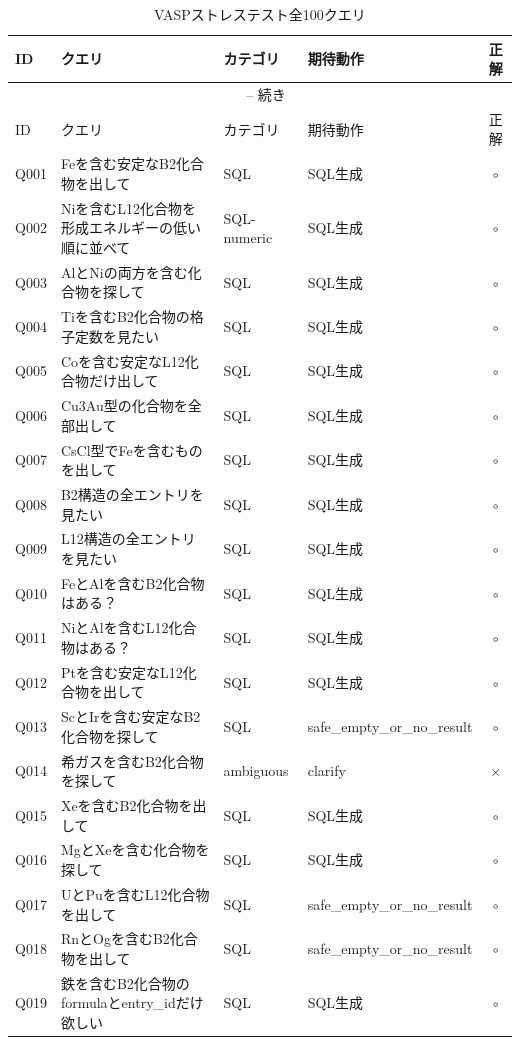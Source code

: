 \documentclass[3p]{elsarticle}
\begin{document}
\begin{longtable}{lp{5cm}llc}
\caption{VASPストレステスト全100クエリ}
\label{tab:vasp_full} \\
\toprule
ID & クエリ & カテゴリ & 期待動作 & 正解 \\
\midrule
\endfirsthead
\multicolumn{5}{c}{\tablename~\thetable{} -- 続き} \\
\toprule
ID & クエリ & カテゴリ & 期待動作 & 正解 \\
\midrule
\endhead
\bottomrule
\endfoot

  Q001 & Feを含む安定なB2化合物を出して & SQL & SQL生成 & $\circ$ \\
  Q002 & Niを含むL12化合物を形成エネルギーの低い順に並べて & SQL-numeric & SQL生成 & $\circ$ \\
  Q003 & AlとNiの両方を含む化合物を探して & SQL & SQL生成 & $\circ$ \\
  Q004 & Tiを含むB2化合物の格子定数を見たい & SQL & SQL生成 & $\circ$ \\
  Q005 & Coを含む安定なL12化合物だけ出して & SQL & SQL生成 & $\circ$ \\
  Q006 & Cu3Au型の化合物を全部出して & SQL & SQL生成 & $\circ$ \\
  Q007 & CsCl型でFeを含むものを出して & SQL & SQL生成 & $\circ$ \\
  Q008 & B2構造の全エントリを見たい & SQL & SQL生成 & $\circ$ \\
  Q009 & L12構造の全エントリを見たい & SQL & SQL生成 & $\circ$ \\
  Q010 & FeとAlを含むB2化合物はある？ & SQL & SQL生成 & $\circ$ \\
  Q011 & NiとAlを含むL12化合物はある？ & SQL & SQL生成 & $\circ$ \\
  Q012 & Ptを含む安定なL12化合物を出して & SQL & SQL生成 & $\circ$ \\
  Q013 & ScとIrを含む安定なB2化合物を探して & SQL & safe\_empty\_or\_no\_result & $\circ$ \\
  Q014 & 希ガスを含むB2化合物を探して & ambiguous & clarify & $\times$ \\
  Q015 & Xeを含むB2化合物を出して & SQL & SQL生成 & $\circ$ \\
  Q016 & MgとXeを含む化合物を探して & SQL & SQL生成 & $\circ$ \\
  Q017 & UとPuを含むL12化合物を出して & SQL & safe\_empty\_or\_no\_result & $\circ$ \\
  Q018 & RnとOgを含むB2化合物を出して & SQL & safe\_empty\_or\_no\_result & $\circ$ \\
  Q019 & 鉄を含むB2化合物のformulaとentry\_idだけ欲しい & SQL & SQL生成 & $\circ$ \\

\end{longtable}
\end{document}
